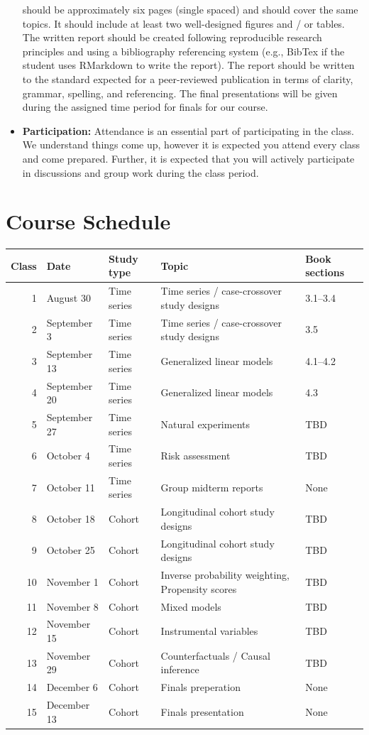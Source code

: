 \documentclass[
]{book}
\begin{document}
\begin{itemize}
  should be approximately six pages (single spaced) and should cover the
  same topics. It should include at least two well-designed figures and / or
  tables. The written report should be created following reproducible
  research principles and using a bibliography referencing system (e.g.,
  BibTex if the student uses RMarkdown to write the report). The report
  should be written to the standard expected for a peer-reviewed
  publication in terms of clarity, grammar, spelling, and referencing.
  The final presentations will be given during the assigned time period
  for finals for our course.
\item
  \textbf{Participation:} Attendance is an essential part of participating
  in the class. We understand things come up, however it is expected you
  attend every class and come prepared. Further, it is expected that you will
  actively participate in discussions and group work during the class period.
\end{itemize}

\hypertarget{course-schedule}{%
\section{Course Schedule}\label{course-schedule}}

\begin{tabular}{r|l|l|l|l}
\hline
Class & Date & Study type & Topic & Book sections\\
\hline
1 & August 30 & Time series & Time series / case-crossover study designs & 3.1--3.4\\
\hline
2 & September 3 & Time series & Time series / case-crossover study designs & 3.5\\
\hline
3 & September 13 & Time series & Generalized linear models & 4.1--4.2\\
\hline
4 & September 20 & Time series & Generalized linear models & 4.3\\
\hline
5 & September 27 & Time series & Natural experiments & TBD\\
\hline
6 & October 4 & Time series & Risk assessment & TBD\\
\hline
7 & October 11 & Time series & Group midterm reports & None\\
\hline
8 & October 18 & Cohort & Longitudinal cohort study designs & TBD\\
\hline
9 & October 25 & Cohort & Longitudinal cohort study designs & TBD\\
\hline
10 & November 1 & Cohort & Inverse probability weighting, Propensity scores & TBD\\
\hline
11 & November 8 & Cohort & Mixed models & TBD\\
\hline
12 & November 15 & Cohort & Instrumental variables & TBD\\
\hline
13 & November 29 & Cohort & Counterfactuals / Causal inference & TBD\\
\hline
14 & December 6 & Cohort & Finals preperation & None\\
\hline
15 & December 13 & Cohort & Finals presentation & None\\
\hline
\end{tabular}
\end{document}
